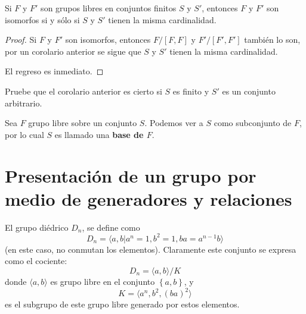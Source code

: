 \documentclass[12pt]{report}
\theoremstyle{largebreak}
\begin{document}
    \begin{cor}
        Si $F$ y $F'$ son grupos libres en conjuntos finitos $S$ y $S'$, entonces $F$ y $F'$ son isomorfos si y sólo si $S$ y $S'$ tienen la misma cardinalidad.
    \end{cor}

    \begin{proof}
        Si $F$ y $F'$ son isomorfos, entonces $F/[F,F]$ y $F'/[F',F']$ también lo son, por un corolario anterior se sigue que $S$ y $S'$ tienen la misma cardinalidad.

        El regreso es inmediato.
    \end{proof}

    \begin{excer}
        Pruebe que el corolario anterior es cierto si $S$ es finito y $S'$ es un conjunto arbitrario.
    \end{excer}

    \begin{mydef}
        Sea $F$ grupo libre sobre un conjunto $S$. Podemos ver a $S$ como subconjunto de $F$, por lo cual $S$ es llamado una \textbf{base de $F$}.
    \end{mydef}

    \section{Presentación de un grupo por medio de generadores y relaciones}

    \begin{exa}
        El grupo diédrico $D_n$, se define como
        \begin{equation*}
            D_n=\langle a,b\Big|a^n=1,b^2=1,ba=a^{n-1}b \rangle
        \end{equation*}
        (en este caso, no conmutan los elementos). Claramente este conjunto se expresa como el cociente:
        \begin{equation*}
            D_n=\langle a,b\rangle/K
        \end{equation*}
        donde $\langle a,b\rangle$ es grupo libre en el conjunto $\left\{a,b \right\}$, y
        \begin{equation*}
            K=\langle a^n,b^2,(ba)^2\rangle
        \end{equation*}
        es el subgrupo de este grupo libre generado por estos elementos.
    \end{exa}

    \newpage
\end{document}

